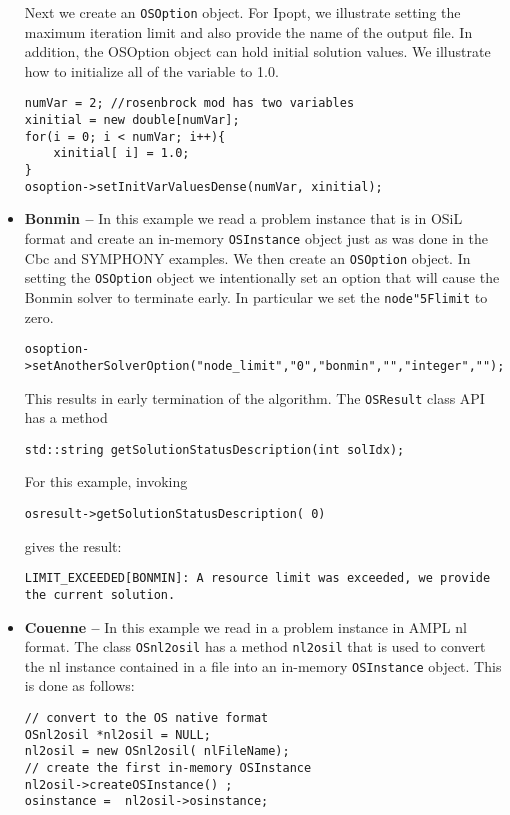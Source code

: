 \documentclass[11pt]{article}
\renewcommand{\_}{{\char"5F}}
\renewcommand{\{}{{\char"7B}}
\renewcommand{\}}{{\char"7D}}
\renewcommand{\^}{{\char"0D}}
\renewcommand{\'}{{\char"0D}}
\begin{document}
\begin{itemize}
Next we create an {\tt OSOption} object. For Ipopt, we illustrate setting the maximum iteration limit 
and also provide the name of the output file. In addition, the OSOption object can hold initial solution 
values. We illustrate how to initialize all of the variable to 1.0.

\begin{verbatim}
numVar = 2; //rosenbrock mod has two variables 
xinitial = new double[numVar];
for(i = 0; i < numVar; i++){
    xinitial[ i] = 1.0;
}
osoption->setInitVarValuesDense(numVar, xinitial);
\end{verbatim}



\item {\bf Bonmin --}  In this example we read a problem instance that is in OSiL format and create 
an in-memory {\tt OSInstance} object just as was done in the Cbc and SYMPHONY examples.   
We then create an {\tt OSOption} object.  In setting the  {\tt OSOption} object we intentionally 
set an option that will cause the Bonmin solver to terminate early.  In particular we set the 
{\tt node\_limit} to zero. 

\begin{verbatim}
osoption->setAnotherSolverOption("node_limit","0","bonmin","","integer","");
\end{verbatim}

This results in early termination of the algorithm. The {\tt OSResult} class API has a method
\begin{verbatim}
std::string getSolutionStatusDescription(int solIdx);
\end{verbatim}

For this example, invoking
\begin{verbatim}
osresult->getSolutionStatusDescription( 0)
\end{verbatim}
gives the result:
\begin{verbatim}
LIMIT_EXCEEDED[BONMIN]: A resource limit was exceeded, we provide the current solution.
\end{verbatim}


\item {\bf Couenne --}   In this example we read in a problem instance in AMPL nl format.  
The class {\tt OSnl2osil}  has a method {\tt nl2osil} that is used to convert the nl instance 
contained in a file into an in-memory {\tt OSInstance} object. This is done as follows:

\begin{verbatim}
// convert to the OS native format
OSnl2osil *nl2osil = NULL;
nl2osil = new OSnl2osil( nlFileName);
// create the first in-memory OSInstance
nl2osil->createOSInstance() ;
osinstance =  nl2osil->osinstance;
\end{verbatim}
\end{itemize}
\end{document}
